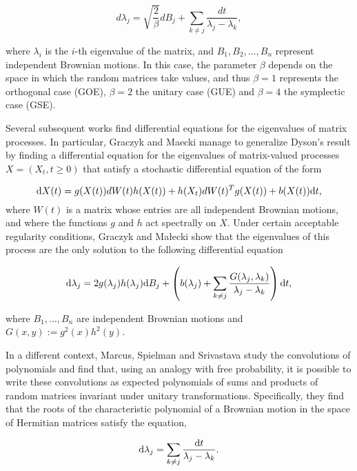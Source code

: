 \begin{equation}
d\lambda_j = \sqrt{\frac2\beta} dB_j + \sum_{k\neq j} \frac{dt}{\lambda_j-\lambda_k}, \label{eq:dys}
\end{equation}

where $\lambda_i$ is the $i$-th eigenvalue of the matrix, and $B_1, B_2,\dots,B_n$ represent independent Brownian motions. In this case, the parameter $\beta$ depends on the space in which the random matrices take values, and thus $\beta=1$ represents the orthogonal case (GOE), $\beta=2$ the unitary case (GUE) and $\beta=4$ the symplectic case (GSE).

Several subsequent works find differential equations for the eigenvalues of matrix processes. In particular, Graczyk and Maecki \cite{article:multiyamada} manage to generalize Dyson's result by finding a differential equation for the eigenvalues of matrix-valued processes $X = (X_t, t\ge 0)$ that satisfy a stochastic differential equation of the form

\begin{equation}
\mathrm d X(t) = g(X(t))d W(t)h(X(t)) + h(X_t)dW(t)^Tg(X(t)) + b(X(t))\mathrm d t,
\end{equation}
where $W(t)$ is a matrix whose entries are all independent Brownian motions, and where the functions $g$ and $h$ act spectrally on $X$. Under certain acceptable regularity conditions, Graczyk and Małecki show that the eigenvalues of this process are the only solution to the following differential equation

\begin{equation}
\mathrm d\lambda_j = 2g(\lambda_j)h(\lambda_j)\mathrm d B_j + \left( b(\lambda_j) + \sum_{k\neq j} \frac{G(\lambda_j,\lambda_k)}{\lambda_j - \lambda_k} \right)\mathrm d t,
\end{equation}

where $B_1,\dots,B_n$ are independent Brownian motions and $G(x,y) := g^2(x)h^2(y)$.

In a different context, Marcus, Spielman and Srivastava \cite{article:finitefree} study the convolutions of polynomials and find that, using an analogy with free probability, it is possible to write these convolutions as expected polynomials of sums and products of random matrices invariant under unitary transformations. Specifically, they find that the roots of the characteristic polynomial of a Brownian motion in the space of Hermitian matrices satisfy the equation,

\begin{equation} \label{eq:det_dys}
\mathrm d\lambda_j = \sum_{k\neq j} \frac{\mathrm d t}{\lambda_j-\lambda_k}.
\end{equation}

